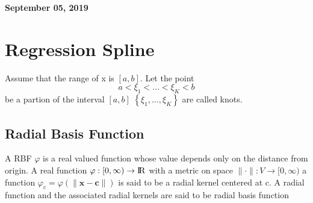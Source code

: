\documentclass[11pt]{article}
\begin{document}
	
	
	
	\newcommand{\Ito}{$It\hat{o}$'$s~Lemma$}
	
	\newcommand\ind{\stackrel{\rm ind}{\sim}}
	\newcommand\iid{\stackrel{\rm iid}{\sim}}
	\renewcommand\c{\mathbf{c}}
	\newcommand\y{\mathbf{y}}
	\newcommand\z{\mathbf{z}}
	\renewcommand\P{\mathbf{P}}
	\newcommand\W{\mathbf{W}}
	\newcommand\X{\mathbf{X}}
	\newcommand\Y{\mathbf{Y}}
	\newcommand\Z{\mathbf{Z}}
	\newcommand\J{{\cal J}}
	\newcommand\B{{\cal B}}
	\newcommand\K{{\cal K}}
	\newcommand\N{{\rm N}}
	\newcommand\bs{\boldsymbol}
	\newcommand\bth{\bs\theta}
	\newcommand\bbe{\bs\beta}
	\renewcommand\*{^\star}
	
	\def\spacingset#1{\renewcommand{\baselinestretch}%
		{#1}\small\normalsize} \spacingset{1}
	
	
	
	\bigskip
	\bigskip
	\bigskip
	\begin{center}
		{\LARGE\bf September 05, 2019 }
	\end{center}
	\medskip
	
	
	
	\spacingset{1.45}
	
	
	
	
	
	\section{Regression Spline}
	
	Assume that the range of x is $[a,b]$. Let the point
	$$ a < \xi_1 < \dots < \xi_K < b$$
	be a partion of the interval $[a,b]$  
	$\left\{ \xi_1 , \dots , \xi_K \right\}$ are called knots.
	
	\subsection{Radial Basis Function}
	A RBF $\varphi$ is a real valued function whose value depends only on the distance from origin.
	A real function $\varphi : [0,\infty) \rightarrow {\rm I\!R}$ with a metric on space $\| \cdot \| : V \rightarrow [0,\infty)$ a function $\varphi_c = \varphi(\|\mathbf{x} - \mathbf{c}\|)$ is said to be a radial kernel centered at c. A radial function and the associated radial kernels are said to be radial basis function
	
\end{document}
